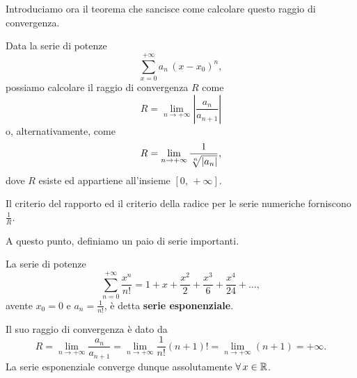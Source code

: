 \documentclass[../../analisi2]{subfiles}
\begin{document}
        Introduciamo ora il teorema che sancisce come calcolare questo raggio di convergenza.

        \begin{teorema}
            \label{thr:calcoloRaggioConvergenzaR}
            Data la serie di potenze 
            \[
                \sum_{x = 0}^{+\infty} a_n \, (x - x_0)^n,
            \]
            possiamo calcolare il raggio di convergenza \(R\) come
            \[
                R = \lim_{n \to +\infty} \left|\frac{a_n}{a_{n+1}}\right|
            \]
            o, alternativamente, come
            \[
                R = \lim_{n \to +\infty} \frac{1}{\sqrt[\leftroot{-1}n]{|a_n|}},
            \]
            dove \(R\) esiste ed appartiene all'insieme \([0, \, +\infty]\).
        \end{teorema}
        \begin{osservazione}
            Il criterio del rapporto ed il criterio della radice per le serie numeriche forniscono \(\frac{1}{R}\).
        \end{osservazione}

        A questo punto, definiamo un paio di serie importanti.

        \begin{definizione}
            \label{def:serieEsponenziale}
            La serie di potenze
            \[
                \sum_{n = 0}^{+\infty} \frac{x^n}{n!} = 1 + x + \frac{x^2}{2} + \frac{x^3}{6} + \frac{x^4}{24} + \ldots,
            \]
            avente \(x_0 = 0\) e \(a_n = \frac{1}{n!}\), è detta \textbf{serie esponenziale}.

            Il suo raggio di convergenza è dato da
            \[
                R = \lim_{n \to +\infty} \frac{a_n}{a_{n+1}} = \lim_{n \to +\infty} \frac{1}{n!} (n + 1)! = \lim_{n \to +\infty} (n + 1) = +\infty.
            \]
            La serie esponenziale converge dunque assolutamente \(\forall \, x \in \mathbb{R}\).
        \end{definizione}
\end{document}
